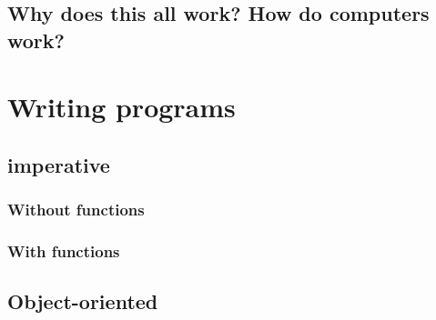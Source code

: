 \documentclass[a4paper,10pt]{scrartcl}
\begin{document}
\subsection{Why does this all work? How do computers work?}



\section{Writing programs}


\subsection{imperative}

\subsubsection{Without functions}

\subsubsection{With functions}

\subsection{Object-oriented}
\end{document}
